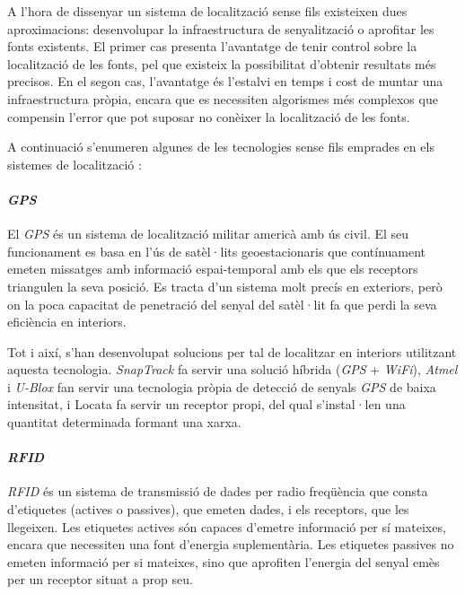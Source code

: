 A l'hora de dissenyar un sistema de localització sense fils existeixen dues aproximacions: desenvolupar la infraestructura de senyalització o aprofitar les fonts existents. El primer cas presenta l'avantatge de tenir control sobre la localització de les fonts, pel que existeix la possibilitat d'obtenir resultats més precisos. En el segon cas, l'avantatge és l'estalvi en temps i cost de muntar una infraestructura pròpia, encara que es necessiten algorismes més complexos que compensin l'error que pot suposar no conèixer la localització de les fonts.

A continuació s'enumeren algunes de les tecnologies sense fils emprades en els sistemes de localització \cite{liu}:

\paragraph{\textit{GPS}}

El \textit{GPS} és un sistema de localització militar americà amb ús civil. El seu funcionament es basa en l’ús de satèl·lits geoestacionaris que contínuament emeten missatges amb informació espai-temporal amb els que els receptors triangulen la seva posició. Es tracta d’un sistema molt precís en exteriors, però on la poca capacitat de penetració del senyal del satèl·lit fa que perdi la seva eficiència en interiors.

Tot i així, s'han desenvolupat solucions per tal de localitzar en interiors utilitzant aquesta tecnologia. \textit{SnapTrack}\cite{moeglein} fa servir una solució híbrida (\textit{GPS} + \textit{WiFi}), \textit{Atmel}\cite{liu} i \textit{U-Blox} \cite{wieser} fan servir una tecnologia pròpia de detecció de senyals \textit{GPS} de baixa intensitat, i Locata \cite{barnes} fa servir un receptor propi, del qual s'instal·len una quantitat determinada formant una xarxa.

\paragraph{\textit{RFID}}

\textit{RFID} és un sistema de transmissió de dades per radio freqüència que consta d'etiquetes (actives o passives), que emeten dades, i els receptors, que les llegeixen. Les etiquetes actives són capaces d’emetre informació per sí mateixes, encara que necessiten una font d'energia suplementària. Les etiquetes passives no emeten informació per si mateixes, sino que aprofiten l'energia del senyal emès per un receptor situat a prop seu.

